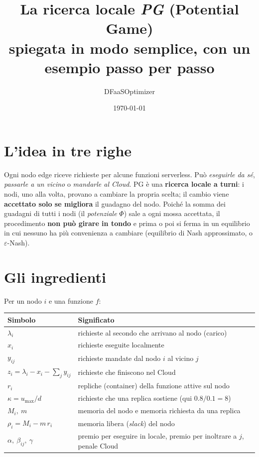 \documentclass[11pt,a4paper]{article}
\title{La ricerca locale \emph{PG} (Potential Game)\\[2pt]
\large spiegata in modo semplice, con un esempio passo per passo}
\author{DFaaSOptimizer}
\date{\today}
\newcommand{\Phiv}{\Phi}
\begin{document}
\maketitle

\section{L'idea in tre righe}

Ogni nodo edge riceve richieste per alcune funzioni serverless. Pu\`o
\emph{eseguirle da s\'e}, \emph{passarle a un vicino} o \emph{mandarle al Cloud}.
PG \`e una \textbf{ricerca locale a turni}: i nodi, uno alla volta, provano a
cambiare la propria scelta; il cambio viene \textbf{accettato solo se migliora}
il guadagno del nodo. Poich\'e la somma dei guadagni di tutti i nodi (il
\emph{potenziale} $\Phiv$) sale a ogni mossa accettata, il procedimento
\textbf{non pu\`o girare in tondo} e prima o poi si ferma in un equilibrio
in cui nessuno ha pi\`u convenienza a cambiare (equilibrio di Nash
approssimato, o $\varepsilon$-Nash).

\section{Gli ingredienti}

Per un nodo $i$ e una funzione $f$:
\begin{center}
\begin{tabular}{@{}ll@{}}
\toprule
Simbolo & Significato \\
\midrule
$\lambda_{i}$ & richieste al secondo che arrivano al nodo (carico) \\
$x_{i}$ & richieste eseguite localmente \\
$y_{ij}$ & richieste mandate dal nodo $i$ al vicino $j$ \\
$z_{i} = \lambda_i - x_i - \sum_j y_{ij}$ & richieste che finiscono nel Cloud \\
$r_{i}$ & repliche (container) della funzione attive sul nodo \\
$\kappa = u_{\max}/d$ & richieste che una replica sostiene (qui $0.8/0.1 = 8$) \\
$M_i,\ m$ & memoria del nodo e memoria richiesta da una replica \\
$\rho_i = M_i - m\,r_i$ & memoria libera (\emph{slack}) del nodo \\
$\alpha,\ \beta_{ij},\ \gamma$ & premio per eseguire in locale, premio per
  inoltrare a $j$, penale Cloud \\
\bottomrule
\end{tabular}
\end{center}
\end{document}
